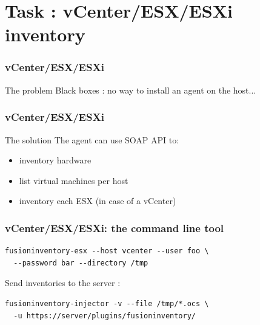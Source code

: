 \documentclass{beamer}
\begin{document}
\section{Task : vCenter/ESX/ESXi inventory}


\begin{frame}
    \frametitle{vCenter/ESX/ESXi}

    \begin{block}{The problem}
    Black boxes : no way to install an agent on the host...
    \end{block}


\end{frame}

\begin{frame}
    \frametitle{vCenter/ESX/ESXi}

    \begin{block}{The solution}
    The agent can use SOAP API to:
        \begin{itemize}
                \item inventory hardware
                \item list virtual machines per host
                \item inventory each ESX (in case of a vCenter)
        \end{itemize}
    \end{block}

\end{frame}

\begin{frame}[fragile]
    \frametitle{vCenter/ESX/ESXi: the command line tool}

\begin{lstlisting}
fusioninventory-esx --host vcenter --user foo \ 
  --password bar --directory /tmp
\end{lstlisting}

Send inventories to the server :
\begin{lstlisting}
fusioninventory-injector -v --file /tmp/*.ocs \ 
  -u https://server/plugins/fusioninventory/
\end{lstlisting}

\end{frame}
\end{document}
